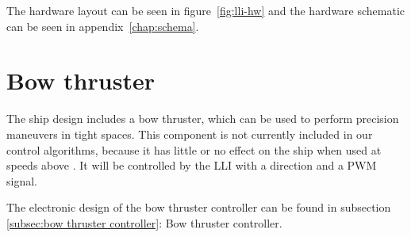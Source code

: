 The hardware layout can be seen in figure~\vref{fig:lli-hw} and the hardware schematic can be seen in appendix~\vref{chap:schema}.



\section{Bow thruster}
The ship design includes a bow thruster, which can be used to perform precision maneuvers in tight spaces. This component is not currently included in our control algorithms, because it has little or no effect on the ship when used at speeds above . It will be controlled by the \ac{LLI} with a direction and a \ac{PWM} signal. 

The electronic design of the bow thruster controller can be found in subsection \ref{subsec:bow thruster controller}: Bow thruster controller.
